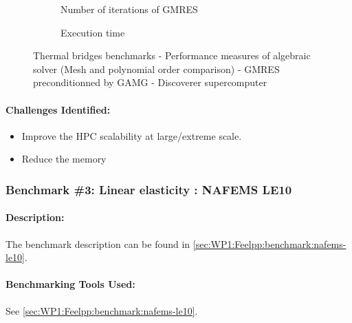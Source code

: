 \begin{figure}
  \begin{subfigure}[c]{\textwidth}
    \centering
    \caption{Number of iterations of GMRES}
  \end{subfigure}
  \begin{subfigure}[c]{\textwidth}
    \centering
    \caption{Execution time}
  \end{subfigure}
  \caption{Thermal bridges benchmarks - Performance measures of algebraic solver
    (Mesh and polynomial order comparison) - GMRES preconditionned by GAMG - Discoverer supercomputer}
  \label{fig:feelpp:wp3:thermal_bridges:performance_measure_all}
\end{figure}


\paragraph{Challenges Identified:} %

\begin{itemize}
\item Improve the HPC scalability at large/extreme scale.
\item Reduce the memory
\end{itemize}

\subsubsection{Benchmark \#3: Linear elasticity : NAFEMS LE10}
\label{sec:WP3:Feelpp:benchmark:nafems-le10}

\paragraph{Description:} %
The benchmark description can be found in
\cref{sec:WP1:Feelpp:benchmark:nafems-le10}.


\paragraph{Benchmarking Tools Used:} %
See \cref{sec:WP1:Feelpp:benchmark:nafems-le10}.

